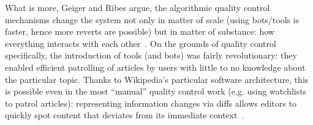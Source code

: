 What is more, Geiger and Ribes argue, the algorithmic quality control mechanisms change the system not only in matter of scale (using bots/tools is faster, hence more reverts are possible) but in matter of substance: how everything interacts with each other~\cite{GeiRib2010}.
On the grounds of quality control specifically, the introduction of tools (and bots) was fairly revolutionary:
they enabled efficient patrolling of articles by users with little to no knowledge about the particular topic.
Thanks to Wikipedia's particular software architecture, this is possible even in the most ``manual'' quality control work (e.g. using watchlists to patrol articles): representing information changes via diffs allows editors to quickly spot content that deviates from its immediate context~\cite{GeiRib2010}.

\begin{comment}
- their relative usage increases/has increased since they were first introduced
    \cite{GeiRib2010}
    "at present, bots make 16.33\% of all edits."
- the whole ecosystem is not transparent, especially for new users (see~\cite{ForGei2012}: "As it is, Kipsizoo is not even
sure whether a real person who deleted the articles or a bot."
"Keeping traces obscure help the powerful to remain in power"~\cite{ForGei2012}
- higher entry barriers: new users have to orientate themselves in the picture and learn to use the software (decentralised mode of governance, often "impenetrable for new editors", vgl~\cite{ForGei2012})

!! tools not only speed up the process but:
    "These tools greatly lower certain barriers to participation and render editing
    activity into work that can be performed by "average
    volunteers" who may have little to no knowledge of the
    content of the article at hand"

\cite{GeiRib2010}
Check Figure 1: Edits to AIV by tool (in the meantime 10 years old. is there newer data on the topic??)
not really, see:
\cite{Geiger2017}
"In the English-lan-
guage Wikipedia, 22 of the 25 most active editors (by
number of edits) are bot accounts, and July 2017, they
made about 20\% of all edits to encyclopedia articles."
Geiger's evidence:
https://quarry.wmflabs.org/query/20703
Percent of bot edits in previous month (enwiki, all pages)
\begin{verbatim}
is_bot	edits	Percentage of all edits
0	    7619466	79.4974
1	    1965083	20.5026
\end{verbatim}


\end{comment}
